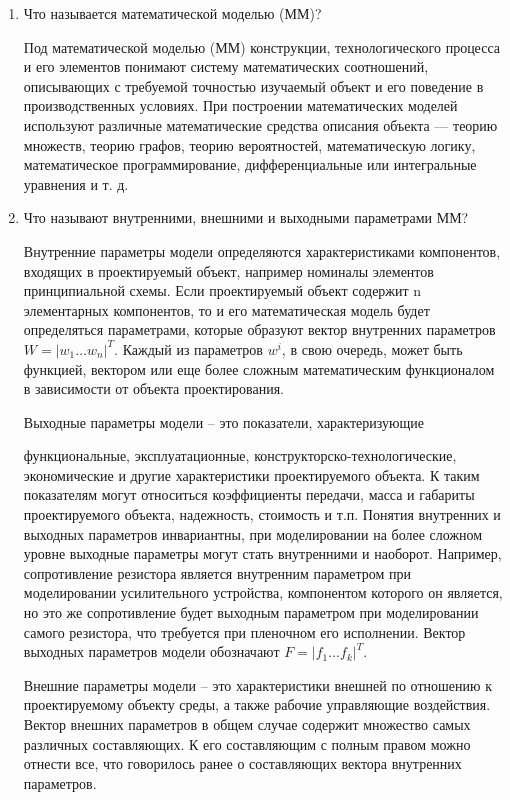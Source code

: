 \documentclass[a4paper,14pt]{article}
\begin{document}
\begin{enumerate}
	\item Что называется математической моделью (ММ)?

Под математической моделью (ММ) конструкции, технологического процесса и его элементов понимают систему математических соотношений, описывающих с требуемой точностью изучаемый объект и его поведение в производственных условиях. При построении математических моделей используют различные математические средства описания объекта — теорию множеств, теорию графов, теорию вероятностей, математическую логику, математическое программирование, дифференциальные или интегральные уравнения и т. д.


	\item	Что называют внутренними, внешними и выходными параметрами ММ?

Внутренние параметры модели определяются характеристиками компонентов, входящих в проектируемый объект, например номиналы элементов принципиальной схемы. Если проектируемый объект содержит n элементарных компонентов, то и его математическая модель будет определяться параметрами, которые образуют вектор внутренних параметров $W = |w_1…w_n|^T$. Каждый из параметров $w^i$, в свою очередь, может быть функцией, вектором или еще более сложным математическим функционалом в зависимости от объекта проектирования.

Выходные	параметры	модели	–	это	показатели,	характеризующие

функциональные, эксплуатационные, конструкторско-технологические, экономические и другие характеристики проектируемого объекта. К таким показателям могут относиться коэффициенты передачи, масса и габариты проектируемого объекта, надежность, стоимость и т.п. Понятия внутренних и выходных параметров инвариантны, при моделировании на более сложном уровне выходные параметры могут стать внутренними и наоборот. Например, сопротивление резистора является внутренним параметром при моделировании усилительного устройства, компонентом которого он является, но это же сопротивление будет выходным параметром при моделировании самого резистора, что требуется при пленочном его исполнении. Вектор выходных параметров модели обозначают $F = |f_1…f_k|^T$.

Внешние параметры модели – это характеристики внешней по отношению к проектируемому объекту среды, а также рабочие управляющие воздействия. Вектор внешних параметров в общем случае содержит множество самых различных составляющих. К его составляющим с полным правом можно отнести все, что говорилось ранее о составляющих вектора внутренних параметров.


\end{enumerate}
\end{document}
